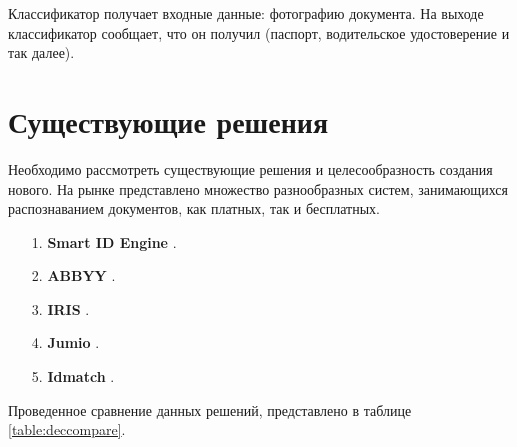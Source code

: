 Классификатор получает входные данные: фотографию документа. На выходе классификатор сообщает, что он получил (паспорт, водительское удостоверение и так далее).

\section{Существующие решения}

Необходимо рассмотреть существующие решения и целесообразность создания нового. На рынке представлено множество разнообразных систем, занимающихся распознаванием документов, как платных, так и бесплатных.

\begin{enumerate}
\item[1.] \textbf{Smart ID Engine} \cite{smartengine}.

\item[2.] \textbf{ABBYY} \cite{abbyy}.

\item[3.] \textbf{IRIS} \cite{iris}.

\item[4.] \textbf{Jumio} \cite{jumio}.

\item[5.] \textbf{Idmatch} \cite{idmatch}.
\end{enumerate}

Проведенное сравнение данных решений, представлено в таблице \ref{table:deccompare}.

